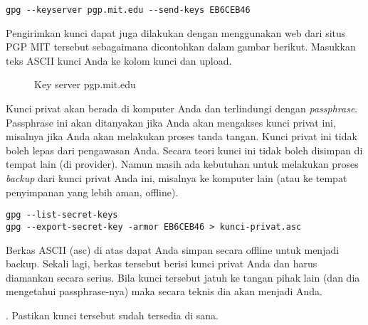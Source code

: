 \begin{verbatim}
gpg --keyserver pgp.mit.edu --send-keys EB6CEB46
\end{verbatim}

Pengirimkan kunci dapat juga dilakukan dengan menggunakan web dari situs PGP
MIT tersebut sebagaimana dicontohkan dalam gambar berikut. Masukkan teks ASCII
kunci Anda ke kolom kunci dan upload.

\begin{figure}[ht]
\caption{Key server pgp.mit.edu}
\label{fig:pgp-mit}
\end{figure}


Kunci privat akan berada di komputer Anda dan terlindungi dengan {\em passphrase}.
Passphrase ini akan ditanyakan jika Anda akan mengakses kunci privat ini,
misalnya jika Anda akan melakukan proses tanda tangan.
Kunci privat ini tidak boleh lepas dari pengawasan Anda. 
Secara teori kunci ini tidak boleh disimpan di tempat lain (di provider).
Namun masih ada kebutuhan untuk melakukan proses {\em backup} dari kunci privat
Anda ini, misalnya ke komputer lain (atau ke tempat penyimpanan yang lebih aman,
offline).

\begin{verbatim}
gpg --list-secret-keys
gpg --export-secret-key -armor EB6CEB46 > kunci-privat.asc
\end{verbatim}

Berkas ASCII (asc) di atas dapat Anda simpan secara offline untuk menjadi backup.
Sekali lagi, berkas tersebut berisi kunci privat Anda dan harus diamankan
secara serius.
Bila kunci tersebut jatuh ke tangan pihak lain (dan dia mengetahui passphrase-nya)
maka secara teknis dia akan menjadi Anda.


\begin{mdframed}[backgroundcolor=blue!20,linewidth=0pt,innerrightmargin=50pt]
\begin{ExerciseList}
   \Exercise[title=Membuat Kunci]
   . Pastikan kunci tersebut sudah
   tersedia di sana.
\end{ExerciseList}

\end{mdframed}


